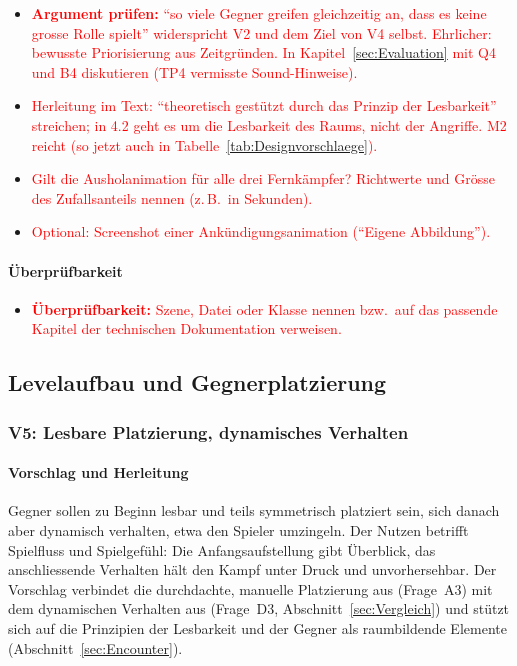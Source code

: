 \documentclass[../Main.tex]{subfiles}
\begin{document}
\begin{itemize}[leftmargin=1.5cm]
    \item \textcolor{red}{\textbf{Argument prüfen:} \enquote{so viele Gegner greifen gleichzeitig an, dass es keine grosse Rolle spielt} widerspricht V2 und dem Ziel von V4 selbst. Ehrlicher: bewusste Priorisierung aus Zeitgründen. In Kapitel~\ref{sec:Evaluation} mit Q4 und B4 diskutieren (TP4 vermisste Sound-Hinweise).}
    \item \textcolor{red}{Herleitung im Text: \enquote{theoretisch gestützt durch das Prinzip der Lesbarkeit} streichen; in 4.2 geht es um die Lesbarkeit des Raums, nicht der Angriffe.  M2 reicht (so jetzt auch in Tabelle~\ref{tab:Designvorschlaege}).}
    \item \textcolor{red}{Gilt die Ausholanimation für alle drei Fernkämpfer? Richtwerte und Grösse des Zufallsanteils nennen (z.\,B.\ in Sekunden).}
    \item \textcolor{red}{Optional: Screenshot einer Ankündigungsanimation (\enquote{Eigene Abbildung}).}
\end{itemize}

\paragraph{Überprüfbarkeit}
\begin{itemize}[leftmargin=1.5cm]
    \item \textcolor{red}{\textbf{Überprüfbarkeit:} Szene, Datei oder Klasse nennen bzw.\ auf das passende Kapitel der technischen Dokumentation verweisen.}
\end{itemize}

\subsection{Levelaufbau und Gegnerplatzierung} \label{sec:UmsetzungLevel}

\subsubsection{V5: Lesbare Platzierung, dynamisches Verhalten} \label{sec:V5}

\paragraph{Vorschlag und Herleitung}
Gegner sollen zu Beginn lesbar und teils symmetrisch platziert sein, sich danach aber dynamisch verhalten, etwa den Spieler umzingeln. Der Nutzen betrifft Spielfluss und Spielgefühl: Die Anfangsaufstellung gibt Überblick, das anschliessende Verhalten hält den Kampf unter Druck und unvorhersehbar. Der Vorschlag verbindet die durchdachte, manuelle Platzierung aus  (Frage~A3) mit dem dynamischen Verhalten aus  (Frage~D3, Abschnitt~\ref{sec:Vergleich}) und stützt sich auf die Prinzipien der Lesbarkeit und der Gegner als raumbildende Elemente (Abschnitt~\ref{sec:Encounter}).
\end{document}

